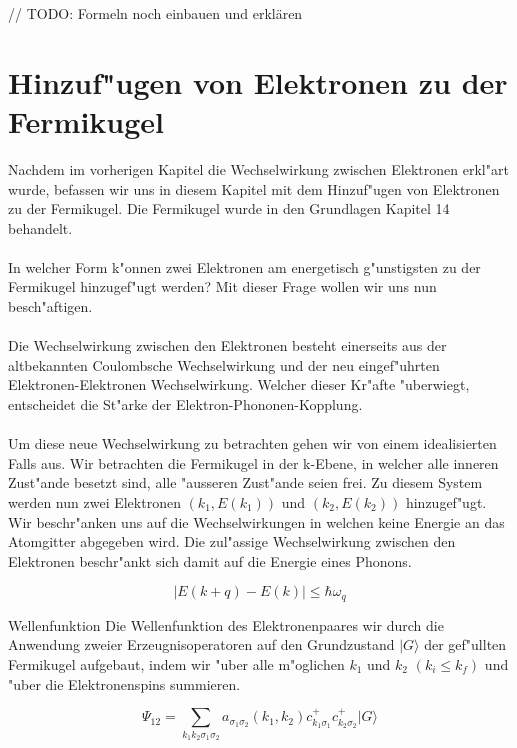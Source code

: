 \begin{refsection}
//
TODO: Formeln noch einbauen und erklären

\section{Hinzuf"ugen von Elektronen zu der Fermikugel}
Nachdem im vorherigen Kapitel die Wechselwirkung zwischen Elektronen erkl"art wurde, befassen wir uns in diesem Kapitel mit dem Hinzuf"ugen von Elektronen zu der Fermikugel. Die Fermikugel wurde in den Grundlagen Kapitel 14 behandelt.
\\
\\
In welcher Form k"onnen zwei Elektronen am energetisch g"unstigsten zu der Fermikugel hinzugef"ugt werden? Mit dieser Frage wollen wir uns nun besch"aftigen.
\\
\\
Die Wechselwirkung zwischen den Elektronen besteht einerseits aus der altbekannten Coulombsche Wechselwirkung und der neu eingef"uhrten Elektronen-Elektronen Wechselwirkung. Welcher dieser Kr"afte "uberwiegt, entscheidet die St"arke der Elektron-Phononen-Kopplung.
\\
\\
Um diese neue Wechselwirkung zu betrachten gehen wir von einem idealisierten Falls aus. Wir betrachten die Fermikugel in der k-Ebene, in welcher alle inneren Zust"ande besetzt sind, alle "ausseren Zust"ande seien frei. Zu diesem System werden nun zwei Elektronen $(k_1,E(k_1))$ und $(k_2,E(k_2))$ hinzugef"ugt. Wir beschr"anken uns auf die Wechselwirkungen in welchen keine Energie an das Atomgitter abgegeben wird. Die zul"assige Wechselwirkung zwischen den Elektronen beschr"ankt sich damit auf die Energie eines Phonons.

\[
|E(k+q)-E(k)|\le\hbar\omega_q
\]

Wellenfunktion
Die Wellenfunktion des Elektronenpaares wir durch die Anwendung zweier Erzeugnisoperatoren auf den Grundzustand $|G\rangle$ der gef"ullten Fermikugel aufgebaut, indem wir "uber alle m"oglichen $k_1$ und $k_2$ $(k_i \le k_f)$ und "uber die Elektronenspins summieren.

\[
\Psi_{12}=\sum \limits_{k_1k_2\sigma_1\sigma_2} a_{\sigma_1\sigma_2}(k_1,k_2)c^+_{k_1\sigma_1}c^+_{k_2\sigma_2}|G\rangle
\]


\end{refsection}
